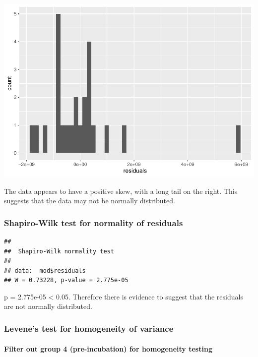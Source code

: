 \documentclass[
]{article}
\newenvironment{Shaded}{\begin{snugshade}}{\end{snugshade}}
\newcommand{\FunctionTok}[1]{\textcolor[rgb]{0.13,0.29,0.53}{\textbf{#1}}}
\newcommand{\NormalTok}[1]{#1}
\newcommand{\SpecialCharTok}[1]{\textcolor[rgb]{0.81,0.36,0.00}{\textbf{#1}}}
\begin{document}
\includegraphics{analysis_files/figure-latex/plot-residuals-allgroups-1.pdf}

The data appears to have a positive skew, with a long tail on the right.
This suggests that the data may not be normally distributed.

\subsubsection{Shapiro-Wilk test for normality of
residuals}\label{shapiro-wilk-test-for-normality-of-residuals}

\begin{Shaded}
\end{Shaded}

\begin{verbatim}
## 
##  Shapiro-Wilk normality test
## 
## data:  mod$residuals
## W = 0.73228, p-value = 2.775e-05
\end{verbatim}

p = 2.775e-05 \textless{} 0.05. Therefore there is evidence to suggest
that the residuals are not normally distributed.

\subsubsection{Levene's test for homogeneity of
variance}\label{levenes-test-for-homogeneity-of-variance}

\paragraph{Filter out group 4 (pre-incubation) for homogeneity
testing}\label{filter-out-group-4-pre-incubation-for-homogeneity-testing}
\end{document}
